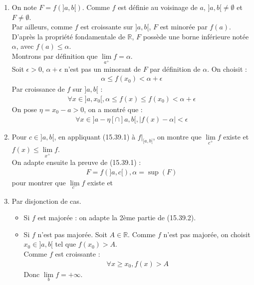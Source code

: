 \documentclass[../main.tex]{subfiles}
\begin{document}
\begin{enumerate}
    \item On note $F = f(]a, b[)$. Comme $f$ est définie au voisinage de $a$, $]a, b[ \neq \emptyset$ et $F \neq \emptyset$. \\
    Par ailleurs, comme $f$ est croissante sur $]a, b[$, $F$ est minorée par $f(a)$. \\
    D'après la propriété fondamentale de $\mathbb{R}$, $F$ possède une borne inférieure notée $\alpha$, avec $f(a) \leq \alpha$. \\
    Montrons par définition que $\lim\limits_{a^+} f = \alpha$. \\
    Soit $\epsilon > 0$, $\alpha + \epsilon$ n'est pas un minorant de $F$ par définition de $\alpha$. On choisit : 
    \begin{align*}
        \alpha \leq f(x_0) < \alpha + \epsilon
    \end{align*}
    Par croissance de $f$ sur $]a, b[$ : 
    \begin{align*}
        \forall x \in ]a, x_0[, \alpha \leq f(x) \leq f(x_0) < \alpha + \epsilon
    \end{align*}
    On pose $\eta = x_0 - a > 0$, on a montré que : 
    \begin{align*}
        \boxed{\forall x \in ]a - \eta[ \cap ]a, b[, |f(x) - \alpha| < \epsilon}
    \end{align*}

    \item Pour $c \in ]a, b[$, en appliquant (15.39.1) à $\left. f \right|_{[a, b[}$, on montre que $\lim\limits_{c^+} f$ existe et $f(x) \leq \lim\limits_{x^+} f$. \\
    On adapte ensuite la preuve de (15.39.1) : 
    \begin{align*}
        F = f(]a, c[), \alpha = \sup (F)
    \end{align*}
    pour montrer que $\lim\limits_{c^-} f$ existe et 

    \item Par disjonction de cas. \\
    \begin{itemize}
        \item Si $f$ est majorée : on adapte la 2ème partie de (15.39.2). 
        \item Si $f$ n'est pas majorée. Soit $A \in \mathbb{R}$. Comme $f$ n'est pas majorée, on choisit $x_0 \in ]a, b[$ tel que $f(x_0) > A$. \\
        Comme $f$ est croissante : 
        \begin{align*}
            \forall x \geq x_0, f(x) > A
        \end{align*}
        Donc $\lim\limits_{b} f = +\infty$. 
    \end{itemize}
\end{enumerate}
\end{document}
